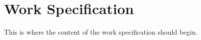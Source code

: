 \section{Work Specification}
This is where the content of the work specification should begin. \par

